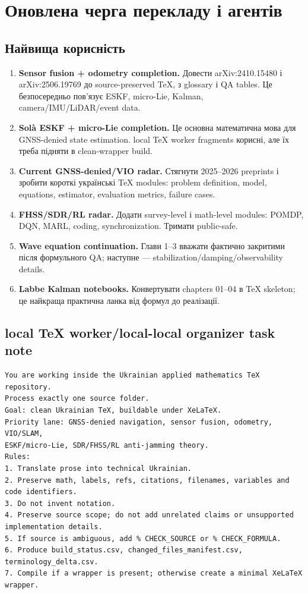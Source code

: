 \chapter{Оновлена черга перекладу і агентів}

\section*{Найвища корисність}

\begin{enumerate}[leftmargin=2em]
\item \textbf{Sensor fusion + odometry completion.} Довести arXiv:2410.15480 і arXiv:2506.19769 до source-preserved TeX, з glossary і QA tables. Це безпосередньо пов'язує ESKF, micro-Lie, Kalman, camera/IMU/LiDAR/event data.
\item \textbf{Solà ESKF + micro-Lie completion.} Це основна математична мова для GNSS-denied state estimation. local TeX worker fragments корисні, але їх треба підняти в clean-wrapper build.
\item \textbf{Current GNSS-denied/VIO radar.} Стягнути 2025--2026 preprints і зробити короткі українські TeX modules: problem definition, model, equations, estimator, evaluation metrics, failure cases.
\item \textbf{FHSS/SDR/RL radar.} Додати survey-level і math-level modules: POMDP, DQN, MARL, coding, synchronization. Тримати public-safe.
\item \textbf{Wave equation continuation.} Глави 1--3 вважати фактично закритими після формульного QA; наступне --- stabilization/damping/observability details.
\item \textbf{Labbe Kalman notebooks.} Конвертувати chapters 01--04 в TeX skeleton; це найкраща практична ланка від формул до реалізації.
\end{enumerate}

\section*{local TeX worker/local-local organizer task note}

\begin{lstlisting}
You are working inside the Ukrainian applied mathematics TeX repository.
Process exactly one source folder.
Goal: clean Ukrainian TeX, buildable under XeLaTeX.
Priority lane: GNSS-denied navigation, sensor fusion, odometry, VIO/SLAM,
ESKF/micro-Lie, SDR/FHSS/RL anti-jamming theory.
Rules:
1. Translate prose into technical Ukrainian.
2. Preserve math, labels, refs, citations, filenames, variables and code identifiers.
3. Do not invent notation.
4. Preserve source scope; do not add unrelated claims or unsupported implementation details.
5. If source is ambiguous, add % CHECK_SOURCE or % CHECK_FORMULA.
6. Produce build_status.csv, changed_files_manifest.csv, terminology_delta.csv.
7. Compile if a wrapper is present; otherwise create a minimal XeLaTeX wrapper.
\end{lstlisting}

